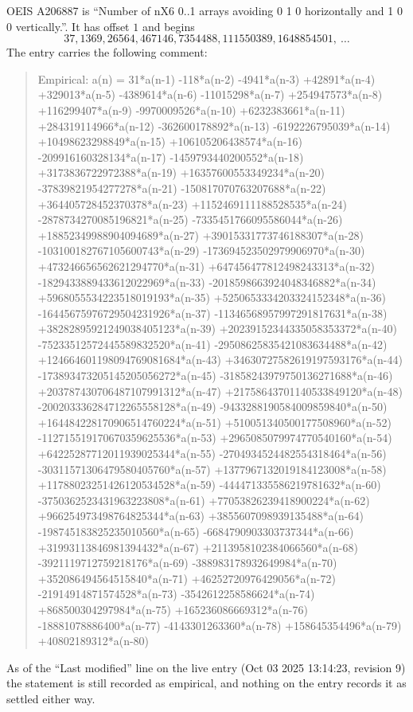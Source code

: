 \documentclass[11pt,a4paper]{article}
\theoremstyle{plain}
\theoremstyle{definition}
\begin{document}
OEIS A206887 is ``Number of nX6 0..1 arrays avoiding 0 1 0 horizontally and 1 0 0 vertically.''. It has offset
$1$ and begins
\[
37, 1369, 26564, 467146, 7354488, 111550389, 1648854501,\ \dots
\]
The entry carries the following comment:
\begin{quote}\small
Empirical: a(n) = 31*a(n-1) -118*a(n-2) -4941*a(n-3) +42891*a(n-4) +329013*a(n-5) -4389614*a(n-6) -11015298*a(n-7) +254947573*a(n-8) +116299407*a(n-9) -9970009526*a(n-10) +6232383661*a(n-11) +284319114966*a(n-12) -362600178892*a(n-13) -6192226795039*a(n-14) +10498623298849*a(n-15) +106105206438574*a(n-16) -209916160328134*a(n-17) -1459793440200552*a(n-18) +3173836722972388*a(n-19) +16357600553349234*a(n-20) -37839821954277278*a(n-21) -150817070763207688*a(n-22) +364405728452370378*a(n-23) +1152469111188528535*a(n-24) -2878734270085196821*a(n-25) -7335451766095586044*a(n-26) +18852349988904094689*a(n-27) +39015331773746188307*a(n-28) -103100182767105600743*a(n-29) -173694523502979906970*a(n-30) +473246656562621294770*a(n-31) +647456477812498243313*a(n-32) -1829433889433612022969*a(n-33) -2018598663924048346882*a(n-34) +5968055534223518019193*a(n-35) +5250653334203324152348*a(n-36) -16445675976729504231926*a(n-37) -11346568957997291817631*a(n-38) +38282895921249038405123*a(n-39) +20239152344335058353372*a(n-40) -75233512572445589832520*a(n-41) -29508625835421083634488*a(n-42) +124664601198094769081684*a(n-43) +34630727582619197593176*a(n-44) -173893473205145205056272*a(n-45) -31858243979750136271688*a(n-46) +203787430706487107991312*a(n-47) +21758643701140533849120*a(n-48) -200203336284712265558128*a(n-49) -9433288190584009859840*a(n-50) +164484228170906514760224*a(n-51) +510051340500177508960*a(n-52) -112715519170670359625536*a(n-53) +2965085079974770540160*a(n-54) +64225287712011939025344*a(n-55) -2704934524482554318464*a(n-56) -30311571306479580405760*a(n-57) +1377967132019184123008*a(n-58) +11788023251426120534528*a(n-59) -444471335586219781632*a(n-60) -3750362523431963223808*a(n-61) +77053826239418900224*a(n-62) +966254973498764825344*a(n-63) +3855607098939135488*a(n-64) -198745183825235010560*a(n-65) -6684790903303737344*a(n-66) +31993113846981394432*a(n-67) +2113958102384066560*a(n-68) -3921119712759218176*a(n-69) -388983178932649984*a(n-70) +352086494564515840*a(n-71) +46252720976429056*a(n-72) -21914914871574528*a(n-73) -3542612258586624*a(n-74) +868500304297984*a(n-75) +165236086669312*a(n-76) -18881078886400*a(n-77) -4143301263360*a(n-78) +158645354496*a(n-79) +40802189312*a(n-80)
\end{quote}
As of the ``Last modified'' line on the live entry (Oct 03 2025 13:14:23, revision
9) the statement is still recorded as empirical, and nothing on the entry
records it as settled either way.
\end{document}
